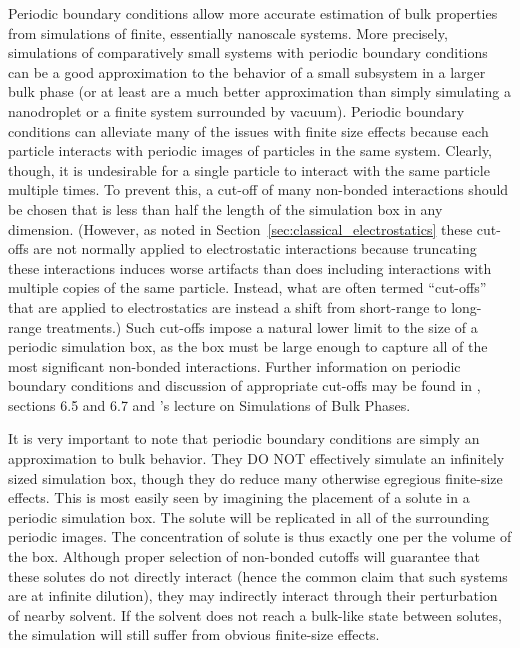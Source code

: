 \documentclass[9pt,bestpractices]{livecoms}
\begin{document}
Periodic boundary conditions allow more accurate estimation of bulk properties from simulations of finite, essentially nanoscale systems.
More precisely, simulations of comparatively small systems with periodic boundary conditions can be a good approximation to the behavior of a small subsystem in a larger bulk phase (or at least are a much better approximation than simply simulating a nanodroplet or a finite system surrounded by vacuum).
Periodic boundary conditions can alleviate many of the issues with finite size effects because each particle interacts with periodic images of particles in the same system.
Clearly, though, it is undesirable for a single particle to interact with the same particle multiple times.
To prevent this, a cut-off of many non-bonded interactions should be chosen that is less than half the length of the simulation box in any dimension.
(However, as noted in Section~\ref{sec:classical_electrostatics} these cut-offs are not normally applied to electrostatic interactions because truncating these interactions induces worse artifacts than does including interactions with multiple copies of the same particle.
Instead, what are often termed ``cut-offs'' that are applied to electrostatics are instead a shift from short-range to long-range treatments.)
Such cut-offs impose a natural lower limit to the size of a periodic simulation box, as the box must be large enough to capture all of the most significant non-bonded interactions.
Further information on periodic boundary conditions and discussion of appropriate cut-offs may be found in \citet{LeachBook}, sections 6.5 and 6.7 and \citet{ShellNotes}'s lecture on Simulations of Bulk Phases.

It is very important to note that periodic boundary conditions are simply an approximation to bulk behavior.
They DO NOT effectively simulate an infinitely sized simulation box, though they do reduce many otherwise egregious finite-size effects.
This is most easily seen by imagining the placement of a solute in a periodic simulation box.
The solute will be replicated in all of the surrounding periodic images.
The concentration of solute is thus exactly one per the volume of the box.
Although proper selection of non-bonded cutoffs will guarantee that these solutes do not directly interact (hence the common claim that such systems are at infinite dilution), they may indirectly interact through their perturbation of nearby solvent.
If the solvent does not reach a bulk-like state between solutes, the simulation will still suffer from obvious finite-size effects.
\end{document}
